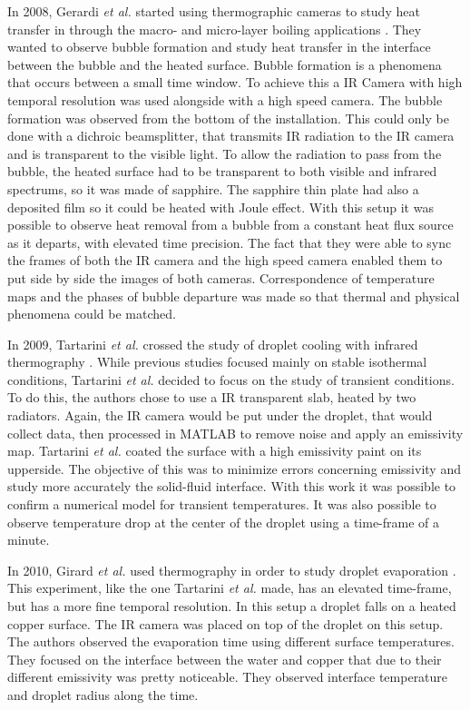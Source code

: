 \par In 2008, Gerardi \textit{et al.} started using thermographic cameras to study heat transfer in through the macro- and micro-layer boiling applications \cite{Gerardi2008}. They wanted to observe bubble formation and study heat transfer in the interface between the bubble and the heated surface. Bubble formation is a phenomena that occurs between a small time window. To achieve this a IR Camera with high temporal resolution was used alongside with a high speed camera. The bubble formation was observed from the bottom of the installation. This could only be done with a dichroic beamsplitter, that transmits IR radiation to the IR camera and is transparent to the visible light. To allow the radiation to pass from the bubble, the heated surface had to be transparent to both visible and infrared spectrums, so it was made of sapphire. The sapphire thin plate had also a deposited film so it could be heated with Joule effect. With this setup it was possible to observe heat removal from a bubble from a constant heat flux source as it departs, with elevated time precision. The fact that they were able to sync the frames of both the IR camera and the high speed camera enabled them to put side by side the images of both cameras. Correspondence of temperature maps and the phases of bubble departure was made so that thermal and physical phenomena could be matched. \\

\par In 2009, Tartarini \textit{et al.} crossed the study of droplet cooling with infrared thermography \cite{tartarini2009}. While previous studies focused mainly on stable isothermal conditions, Tartarini \textit{et al.} decided to focus on the study of transient conditions. To do this, the authors chose to use a IR transparent slab, heated by two radiators. Again, the IR camera would be put under the droplet, that would collect data, then processed in MATLAB to remove noise and apply an emissivity map. Tartarini \textit{et al.} coated the surface with a high emissivity paint on its upperside. The objective of this was to minimize errors concerning emissivity and study more accurately the solid-fluid interface. With this work it was possible to confirm a numerical model for transient temperatures. It was also possible to observe temperature drop at the center of the droplet using a time-frame of a minute. \\

\par In 2010, Girard \textit{et al.} used thermography in order to study droplet evaporation \cite{girard2010infrared}. This experiment, like the one Tartarini \textit{et al.} made, has an elevated time-frame, but has a more fine temporal resolution. In this setup a droplet falls on a heated copper surface. The IR camera was placed on top of the droplet on this setup. The authors observed the evaporation time using different surface temperatures. They focused on the interface between the water and copper that due to their different emissivity was pretty noticeable. They observed interface temperature and droplet radius along the time. \\

